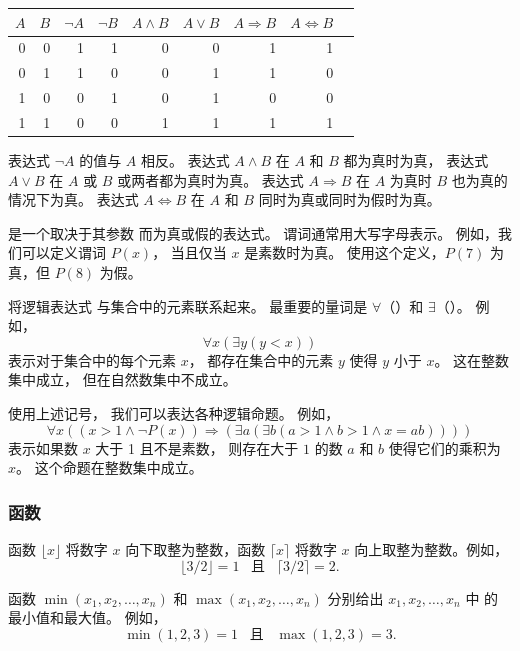 \begin{center}
\begin{tabular}{rr|rrrrrrr}
$A$ & $B$ & $\lnot A$ & $\lnot B$ & $A \land B$ & $A \lor B$ & $A \Rightarrow B$ & $A \Leftrightarrow B$ \\
\hline
0 & 0 & 1 & 1 & 0 & 0 & 1 & 1 \\
0 & 1 & 1 & 0 & 0 & 1 & 1 & 0 \\
1 & 0 & 0 & 1 & 0 & 1 & 0 & 0 \\
1 & 1 & 0 & 0 & 1 & 1 & 1 & 1 \\
\end{tabular}
\end{center}

表达式 $\lnot A$ 的值与 $A$ 相反。
表达式 $A \land B$ 在 $A$ 和 $B$
都为真时为真，
表达式 $A \lor B$ 在 $A$ 或 $B$
或两者都为真时为真。
表达式 $A \Rightarrow B$ 在
$A$ 为真时 $B$ 也为真的情况下为真。
表达式 $A \Leftrightarrow B$ 在
$A$ 和 $B$ 同时为真或同时为假时为真。


是一个取决于其参数
而为真或假的表达式。
谓词通常用大写字母表示。
例如，我们可以定义谓词 $P(x)$，
当且仅当 $x$ 是素数时为真。
使用这个定义，$P(7)$ 为真，但 $P(8)$ 为假。


将逻辑表达式
与集合中的元素联系起来。
最重要的量词是
$\forall$（）和
$\exists$（）。
例如，
\[\forall x (\exists y (y < x))\]
表示对于集合中的每个元素 $x$，
都存在集合中的元素 $y$
使得 $y$ 小于 $x$。
这在整数集中成立，
但在自然数集中不成立。

使用上述记号，
我们可以表达各种逻辑命题。
例如，
\[\forall x ((x>1 \land \lnot P(x)) \Rightarrow (\exists a (\exists b (a > 1 \land b > 1 \land x = ab))))\]
表示如果数 $x$ 大于 1
且不是素数，
则存在大于 $1$ 的数 $a$ 和 $b$
使得它们的乘积为 $x$。
这个命题在整数集中成立。

\subsubsection{函数}

函数 $\lfloor x \rfloor$ 将数字 $x$
向下取整为整数，函数
$\lceil x \rceil$ 将数字 $x$
向上取整为整数。例如，
\[ \lfloor 3/2 \rfloor = 1 \hspace{10pt} \textrm{且} \hspace{10pt} \lceil 3/2 \rceil = 2.\]

函数 $\min(x_1,x_2,\ldots,x_n)$
和 $\max(x_1,x_2,\ldots,x_n)$
分别给出 $x_1,x_2,\ldots,x_n$ 中
的最小值和最大值。
例如，
\[ \min(1,2,3)=1 \hspace{10pt} \textrm{且} \hspace{10pt} \max(1,2,3)=3.\]

